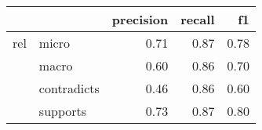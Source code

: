 \begin{tabular}{llrrr}
\toprule
    &          &  precision &  recall &   f1 \\
\midrule
rel & micro &       0.71 &    0.87 & 0.78 \\
    & macro &       0.60 &    0.86 & 0.70 \\
    & contradicts &       0.46 &    0.86 & 0.60 \\
    & supports &       0.73 &    0.87 & 0.80 \\
\bottomrule
\end{tabular}
